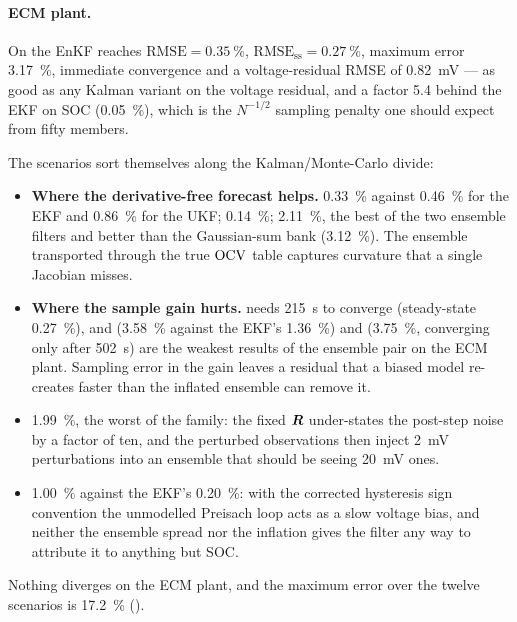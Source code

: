 \paragraph{ECM plant.}  On  the EnKF reaches $\mathrm{RMSE} = \SI{0.35}{\percent}$,
$\mathrm{RMSE}_{\mathrm{ss}} = \SI{0.27}{\percent}$, maximum error \SI{3.17}{\percent}, immediate
convergence and a voltage-residual RMSE of \SI{0.82}{\milli\volt} --- as good as any Kalman variant
on the voltage residual, and a factor \num{5.4} behind the EKF on SOC (\SI{0.05}{\percent}), which
is the $N^{-1/2}$ sampling penalty one should expect from fifty members.

The scenarios sort themselves along the Kalman/Monte-Carlo divide:
\begin{itemize}[leftmargin=2em]
  \item \textbf{Where the derivative-free forecast helps.}  
        \SI{0.33}{\percent} against \SI{0.46}{\percent} for the EKF and \SI{0.86}{\percent} for the
        UKF;  \SI{0.14}{\percent};  \SI{2.11}{\percent}, the best of the
        two ensemble filters and better than the Gaussian-sum bank (\SI{3.12}{\percent}).  The
        ensemble transported through the true $\mathrm{OCV}$ table captures curvature that a single
        Jacobian misses.
  \item \textbf{Where the sample gain hurts.}   needs \SI{215}{\second} to
        converge (steady-state \SI{0.27}{\percent}), and 
        (\SI{3.58}{\percent} against the EKF's \SI{1.36}{\percent}) and 
        (\SI{3.75}{\percent}, converging only after \SI{502}{\second}) are the weakest results of
        the ensemble pair on the ECM plant.  Sampling error in the gain leaves a residual that a
        biased model re-creates faster than the inflated ensemble can remove it.
  \item {} \SI{1.99}{\percent}, the worst of the family: the fixed $\bm{R}$
        under-states the post-step noise by a factor of ten, and the perturbed observations then
        inject \SI{2}{\milli\volt} perturbations into an ensemble that should be seeing
        \SI{20}{\milli\volt} ones.
  \item {} \SI{1.00}{\percent} against the EKF's \SI{0.20}{\percent}: with the
        corrected hysteresis sign convention the unmodelled Preisach loop acts as a slow voltage
        bias, and neither the ensemble spread nor the inflation gives the filter any way to
        attribute it to anything but SOC.
\end{itemize}
Nothing diverges on the ECM plant, and the maximum error over the twelve scenarios is
\SI{17.2}{\percent} ().

